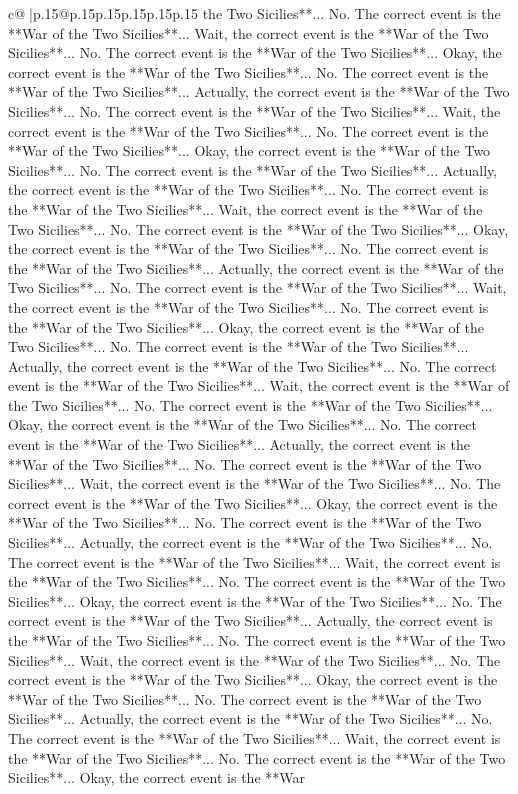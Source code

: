 \documentclass{article}
\begin{document}
{\begin{supertabular}{c@{$\;$}|p{.15\linewidth}@{}p{.15\linewidth}p{.15\linewidth}p{.15\linewidth}p{.15\linewidth}p{.15\linewidth}}
{{{the Two Sicilies**... No. The correct event is the **War of the Two Sicilies**... Wait, the correct event is the **War of the Two Sicilies**... No. The correct event is the **War of the Two Sicilies**... Okay, the correct event is the **War of the Two Sicilies**... No. The correct event is the **War of the Two Sicilies**... Actually, the correct event is the **War of the Two Sicilies**... No. The correct event is the **War of the Two Sicilies**... Wait, the correct event is the **War of the Two Sicilies**... No. The correct event is the **War of the Two Sicilies**... Okay, the correct event is the **War of the Two Sicilies**... No. The correct event is the **War of the Two Sicilies**... Actually, the correct event is the **War of the Two Sicilies**... No. The correct event is the **War of the Two Sicilies**... Wait, the correct event is the **War of the Two Sicilies**... No. The correct event is the **War of the Two Sicilies**... Okay, the correct event is the **War of the Two Sicilies**... No. The correct event is the **War of the Two Sicilies**... Actually, the correct event is the **War of the Two Sicilies**... No. The correct event is the **War of the Two Sicilies**... Wait, the correct event is the **War of the Two Sicilies**... No. The correct event is the **War of the Two Sicilies**... Okay, the correct event is the **War of the Two Sicilies**... No. The correct event is the **War of the Two Sicilies**... Actually, the correct event is the **War of the Two Sicilies**... No. The correct event is the **War of the Two Sicilies**... Wait, the correct event is the **War of the Two Sicilies**... No. The correct event is the **War of the Two Sicilies**... Okay, the correct event is the **War of the Two Sicilies**... No. The correct event is the **War of the Two Sicilies**... Actually, the correct event is the **War of the Two Sicilies**... No. The correct event is the **War of the Two Sicilies**... Wait, the correct event is the **War of the Two Sicilies**... No. The correct event is the **War of the Two Sicilies**... Okay, the correct event is the **War of the Two Sicilies**... No. The correct event is the **War of the Two Sicilies**... Actually, the correct event is the **War of the Two Sicilies**... No. The correct event is the **War of the Two Sicilies**... Wait, the correct event is the **War of the Two Sicilies**... No. The correct event is the **War of the Two Sicilies**... Okay, the correct event is the **War of the Two Sicilies**... No. The correct event is the **War of the Two Sicilies**... Actually, the correct event is the **War of the Two Sicilies**... No. The correct event is the **War of the Two Sicilies**... Wait, the correct event is the **War of the Two Sicilies**... No. The correct event is the **War of the Two Sicilies**... Okay, the correct event is the **War of the Two Sicilies**... No. The correct event is the **War of the Two Sicilies**... Actually, the correct event is the **War of the Two Sicilies**... No. The correct event is the **War of the Two Sicilies**... Wait, the correct event is the **War of the Two Sicilies**... No. The correct event is the **War of the Two Sicilies**... Okay, the correct event is the **War }}}
\end{supertabular}}
\end{document}
